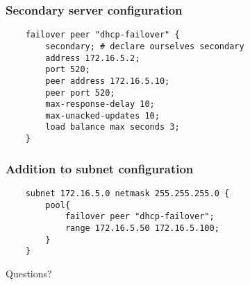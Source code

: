 \documentclass[10pt]{beamer}
\begin{document}
\begin{frame}[fragile]
	\frametitle{Secondary server configuration}
	\begin{verbatim}
	failover peer "dhcp-failover" {
	    secondary; # declare ourselves secondary
	    address 172.16.5.2;
	    port 520;
  	    peer address 172.16.5.10;
	    peer port 520;
	    max-response-delay 10;
	    max-unacked-updates 10;
	    load balance max seconds 3;
	}
	\end{verbatim}

\end{frame}

\begin{frame}[fragile]
	\frametitle{Addition to subnet configuration}
	\begin{verbatim}
	subnet 172.16.5.0 netmask 255.255.255.0 {
	    pool{
	        failover peer "dhcp-failover";
	        range 172.16.5.50 172.16.5.100;
	    }
	}
	\end{verbatim}

\end{frame}
\begin{frame}
	Questions?
\end{frame}
\end{document}
